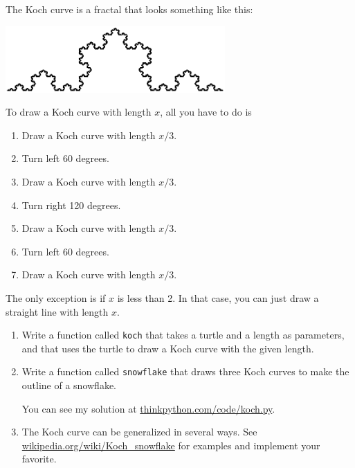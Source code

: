 \documentclass[10pt]{book}
\begin{document}
\begin{ex}


The Koch curve is a fractal that looks something like
this:

\beforefig
\centerline{\includegraphics[height=1in]{figs/koch.eps}}
\afterfig

To draw a Koch curve with length $x$, all you have to do is

\begin{enumerate}

\item Draw a Koch curve with length $x/3$.

\item Turn left 60 degrees.

\item Draw a Koch curve with length $x/3$.

\item Turn right 120 degrees.

\item Draw a Koch curve with length $x/3$.

\item Turn left 60 degrees.

\item Draw a Koch curve with length $x/3$.

\end{enumerate}

The only exception is if $x$ is less than 2.  In that case,
you can just draw a straight line with length $x$.

\begin{enumerate}

\item Write a function called {\tt koch} that takes a turtle and
a length as parameters, and that uses the turtle to draw a Koch
curve with the given length.

\item Write a function called {\tt snowflake} that draws three
Koch curves to make the outline of a snowflake.

You can see my solution at \url{thinkpython.com/code/koch.py}.

\item The Koch curve can be generalized in several ways.  See
\url{wikipedia.org/wiki/Koch_snowflake} for examples and
implement your favorite.

\end{enumerate}
\end{ex}
\end{document}
